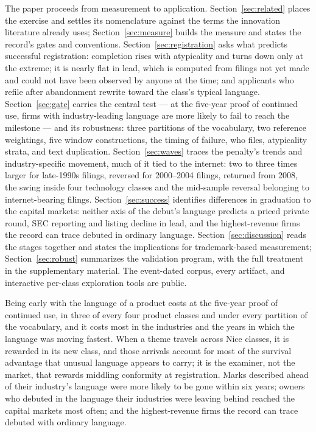 The paper proceeds from measurement to application.
Section~\ref{sec:related} places the exercise and settles its
nomenclature against the terms the innovation literature already uses;
Section~\ref{sec:measure} builds the measure and states the record's
gates and conventions. Section~\ref{sec:registration} asks what predicts
successful registration: completion rises with atypicality and turns
down only at the extreme; it is nearly flat in lead, which is computed
from filings not yet made and could not have been observed by anyone at
the time; and applicants who refile after abandonment rewrite toward the
class's typical language. Section~\ref{sec:gate} carries the central
test --- at the five-year proof of continued use, firms with
industry-leading language are more likely to fail to reach the
milestone --- and its robustness: three partitions of the vocabulary,
two reference weightings, five window constructions, the timing of
failure, who files, atypicality strata, and text duplication.
Section~\ref{sec:waves} traces the penalty's trends and
industry-specific movement, much of it tied to the internet: two to
three times larger for late-1990s filings, reversed for 2000--2004
filings, returned from 2008, the swing inside four technology classes
and the mid-sample reversal belonging to internet-bearing filings.
Section~\ref{sec:success} identifies differences in graduation to the
capital markets: neither axis of the debut's language predicts a priced
private round, SEC reporting and listing decline in lead, and the
highest-revenue firms the record can trace debuted in ordinary language.
Section~\ref{sec:discussion} reads the stages together and states the
implications for trademark-based measurement;
Section~\ref{sec:robust} summarizes the validation program, with the
full treatment in the supplementary material. The event-dated corpus,
every artifact, and interactive per-class exploration tools are public.

Being early with the language of a product costs at the five-year proof
of continued use, in three of every four product classes and under every
partition of the vocabulary, and it costs most in the industries and the
years in which the language was moving fastest. When a theme travels
across Nice classes, it is rewarded in its new class, and those arrivals
account for most of the survival advantage that unusual language appears
to carry; it is the examiner, not the market, that rewards middling
conformity at registration. Marks described ahead of their industry's
language were more likely to be gone within six years; owners who
debuted in the language their industries were leaving behind reached the
capital markets most often; and the highest-revenue firms the record can
trace debuted with ordinary language.
